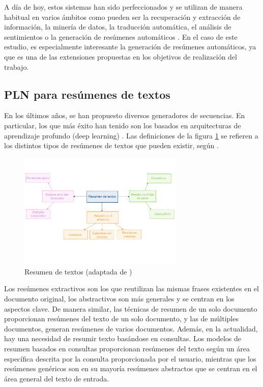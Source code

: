 A día de hoy, estos sistemas han sido perfeccionados y se utilizan de manera habitual en varios ámbitos como pueden ser la recuperación y extracción de información, la minería de datos, la traducción automática, el análisis de sentimientos o la generación de resúmenes automáticos \citep{hernandez2013aplicaciones}. En el caso de este estudio, es especialmente interesante la generación de resúmenes automáticos, ya que es una de las extensiones propuestas en los objetivos de realización del trabajo.

\subsection{PLN para resúmenes de textos}

En los últimos años, se han propuesto diversos generadores de secuencias. En particular, los que más éxito han tenido son los basados en arquitecturas de aprendizaje profundo (deep learning) \citep{mishra2020deep}. Las definiciones de la figura \ref{fig:resumenTextos} se refieren a los distintos tipos de resúmenes de textos que pueden existir, según \cite{adhikari2020nlp}. 

\begin{figure}[h]
	\centering
	\includegraphics[width = 0.7\textwidth]{Imagenes/Vectorial/resumenTextos.pdf}
	\caption{Resumen de textos (adaptada de \cite{adhikari2020nlp})}
	\label{fig:resumenTextos}
\end{figure}

Los resúmenes extractivos son los que reutilizan las mismas frases existentes en el documento original, los abstractivos son más generales y se centran en los aspectos clave. De manera similar, las técnicas de resumen de un solo documento proporcionan resúmenes del texto de un solo documento, y las de múltiples documentos, generan resúmenes de varios documentos. Además, en la actualidad, hay una necesidad de resumir texto basándose en consultas. Los modelos de resumen basados en consultas proporcionan resúmenes del texto según un área específica descrita por la consulta proporcionada por el usuario, mientras que los resúmenes genéricos son en su mayoría resúmenes abstractos que se centran en el área general del texto de entrada.

